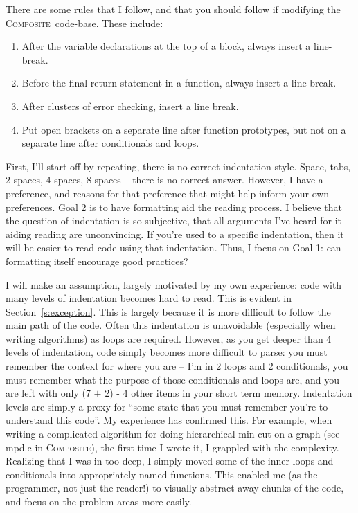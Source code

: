 \documentclass[11pt,onecolumn]{article}
\def\composite{\textsc{Composite}}
\newcommand{\head}[1]{\vspace{0.4em}\noindent{\bf #1}}
\begin{document}
\head{\composite\ conventions.} There are some rules that I follow,
and that you should follow if modifying the \composite\ code-base.
These include:
\begin{enumerate}[itemsep=0pt,topsep=1pt,parsep=1pt,leftmargin=2.5em]
\item After the variable declarations at the top of a block, always
  insert a line-break.
\item Before the final return statement in a function, always insert a
  line-break.
\item After clusters of error checking, insert a line break.
\item Put open brackets on a separate line after function prototypes,
  but not on a separate line after conditionals and loops.
\end{enumerate}

\head{Indentation.}  First, I'll start off by repeating, there is no
correct indentation style.  Space, tabs, 2 spaces, 4 spaces, 8 spaces
-- there is no correct answer.  However, I have a preference, and
reasons for that preference that might help inform your own
preferences.  Goal 2 is to have formatting aid the reading process.  I
believe that the question of indentation is so subjective, that all
arguments I've heard for it aiding reading are unconvincing.  If
you're used to a specific indentation, then it will be easier to read
code using that indentation.  Thus, I focus on Goal 1: can formatting
itself encourage good practices?

I will make an assumption, largely motivated by my own experience:
code with many levels of indentation becomes hard to read.  This is
evident in Section~\ref{s:exception}.  This is largely because it is
more difficult to follow the main path of the code.  Often this
indentation is unavoidable (especially when writing algorithms) as
loops are required.  However, as you get deeper than 4 levels of
indentation, code simply becomes more difficult to parse: you must
remember the context for where you are -- I'm in 2 loops and 2
conditionals, you must remember what the purpose of those conditionals
and loops are, and you are left with only (7 $\pm$ 2) - 4 other items
in your short term memory.  Indentation levels are simply a proxy for
``some state that you must remember you're to understand this code''.
My experience has confirmed this.  For example, when writing a
complicated algorithm for doing hierarchical min-cut on a graph (see
mpd.c in \composite ), the first time I wrote it, I grappled with the
complexity.  Realizing that I was in too deep, I simply moved some of
the inner loops and conditionals into appropriately named functions.
This enabled me (as the programmer, not just the reader!) to visually
abstract away chunks of the code, and focus on the problem areas more
easily.
\end{document}
